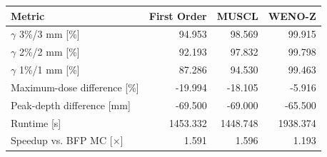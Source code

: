 \begin{tabular}{lrrr}
\toprule
Metric & First Order & MUSCL & WENO-Z \\
\midrule
$\gamma$ 3\%/3 mm [\%] & 94.953 & 98.569 & 99.915 \\
$\gamma$ 2\%/2 mm [\%] & 92.193 & 97.832 & 99.798 \\
$\gamma$ 1\%/1 mm [\%] & 87.286 & 94.530 & 99.463 \\
Maximum-dose difference [\%] & -19.994 & -18.105 & -5.916 \\
Peak-depth difference [mm] & -69.500 & -69.000 & -65.500 \\
Runtime [s] & 1453.332 & 1448.748 & 1938.374 \\
Speedup vs. BFP MC [$\times$] & 1.591 & 1.596 & 1.193 \\
\bottomrule
\end{tabular}
